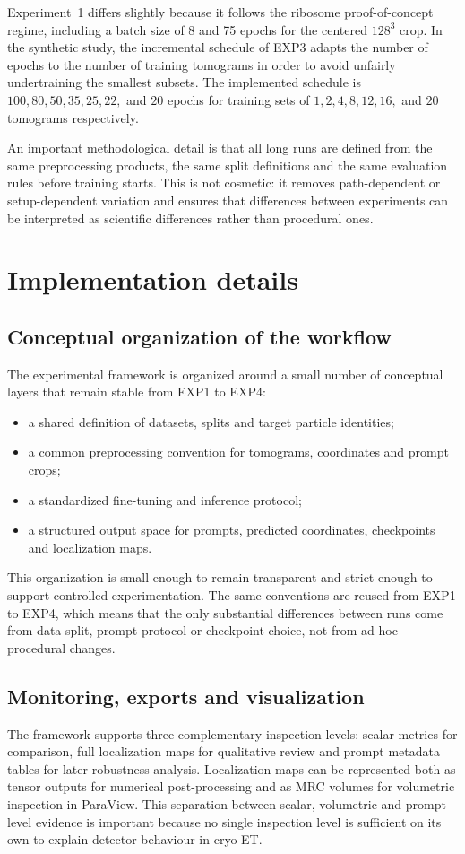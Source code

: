 \documentclass[12pt,a4paper]{report}
\begin{document}
Experiment~1 differs slightly because it follows the ribosome proof-of-concept regime, including a batch size of 8 and 75 epochs for the centered \(128^3\) crop. In the synthetic study, the incremental schedule of EXP3 adapts the number of epochs to the number of training tomograms in order to avoid unfairly undertraining the smallest subsets. The implemented schedule is \(100, 80, 50, 35, 25, 22,\) and \(20\) epochs for training sets of \(1, 2, 4, 8, 12, 16,\) and \(20\) tomograms respectively.

An important methodological detail is that all long runs are defined from the same preprocessing products, the same split definitions and the same evaluation rules before training starts. This is not cosmetic: it removes path-dependent or setup-dependent variation and ensures that differences between experiments can be interpreted as scientific differences rather than procedural ones.

\section{Implementation details}

\subsection{Conceptual organization of the workflow}
The experimental framework is organized around a small number of conceptual layers that remain stable from EXP1 to EXP4:
\begin{itemize}
  \item a shared definition of datasets, splits and target particle identities;
  \item a common preprocessing convention for tomograms, coordinates and prompt crops;
  \item a standardized fine-tuning and inference protocol;
  \item a structured output space for prompts, predicted coordinates, checkpoints and localization maps.
\end{itemize}

This organization is small enough to remain transparent and strict enough to support controlled experimentation. The same conventions are reused from EXP1 to EXP4, which means that the only substantial differences between runs come from data split, prompt protocol or checkpoint choice, not from ad hoc procedural changes.

\subsection{Monitoring, exports and visualization}
The framework supports three complementary inspection levels: scalar metrics for comparison, full localization maps for qualitative review and prompt metadata tables for later robustness analysis. Localization maps can be represented both as tensor outputs for numerical post-processing and as MRC volumes for volumetric inspection in ParaView. This separation between scalar, volumetric and prompt-level evidence is important because no single inspection level is sufficient on its own to explain detector behaviour in cryo-ET.
\end{document}
